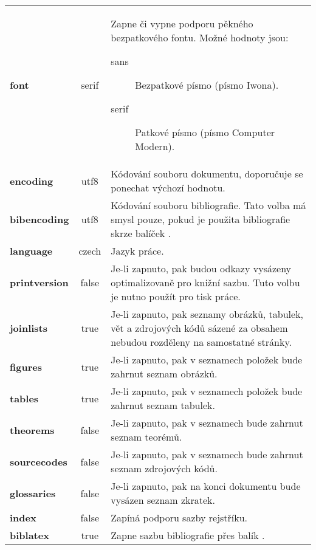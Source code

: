 \documentclass[
  biblatex,
  figures=false,
  glossaries,
  index
]{kidiplom}
\begin{document}
\begin{center}
\begin{longtable}{>{\bfseries}l >{\ttfamily}c L{8cm}}
font & serif & Zapne či vypne podporu pěkného bezpatkového fontu. Možné hodnoty jsou:\newline
\begin{description}
\item[sans] Bezpatkové písmo (písmo Iwona).
\item[serif] Patkové písmo (písmo Computer Modern).
\end{description} \\

encoding & utf8 & Kódování souboru dokumentu, doporučuje se ponechat výchozí hodnotu. \\

bibencoding & utf8 & Kódování souboru bibliografie. Tato volba má smysl pouze, pokud je použita bibliografie skrze balíček \BibLaTeX{}. \\

language & czech & Jazyk práce. \\

printversion & false & Je-li zapnuto, pak budou odkazy vysázeny optimalizovaně pro knižní sazbu. Tuto volbu je nutno použít pro tisk práce. \\


joinlists & true & Je-li zapnuto, pak seznamy obrázků, tabulek, vět a
zdrojových kódů sázené za obsahem nebudou rozděleny na samostatné stránky. \\

figures & true & Je-li zapnuto, pak v seznamech položek bude zahrnut seznam obrázků. \\

tables & true & Je-li zapnuto, pak v seznamech položek bude zahrnut seznam tabulek. \\

theorems & false & Je-li zapnuto, pak v seznamech bude zahrnut seznam teorémů. \\

sourcecodes & false & Je-li zapnuto, pak v seznamech bude zahrnut seznam zdrojových kódů. \\

glossaries & false & Je-li zapnuto, pak na konci dokumentu bude vysázen seznam zkratek. \\

index & false & Zapíná podporu sazby rejstříku. \\

biblatex & true & Zapne sazbu bibliografie přes balík \BibLaTeX{}.
\end{longtable}
\end{center}
\end{document}
